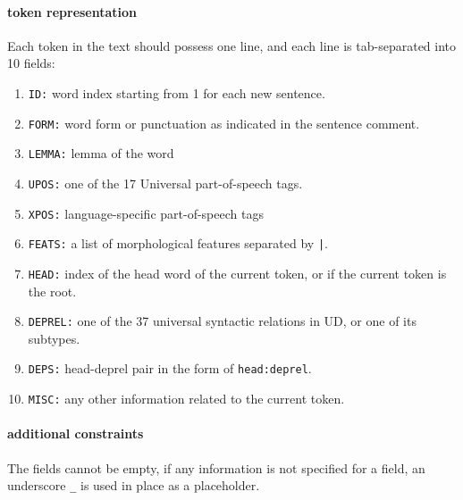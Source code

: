 \paragraph{token representation}
Each token in the text should possess one line, and each line is tab-separated into 10 fields:
\begin{enumerate}
	\item \texttt{ID:} word index starting from 1 for each new sentence.
	\item \texttt{FORM:} word form or punctuation as indicated in the sentence comment.
	\item \texttt{LEMMA:} lemma of the word
	\item \texttt{UPOS:} one of the 17 Universal part-of-speech tags.
	\item \texttt{XPOS:} language-specific part-of-speech tags
	\item \texttt{FEATS:} a list of morphological features separated by \texttt{|}.
	\item \texttt{HEAD:} index of the head word of the current token, or  if the current token is the root.
	\item \texttt{DEPREL:} one of the 37 universal syntactic relations in UD, or one of its subtypes.
	\item \texttt{DEPS:} head-deprel pair in the form of \texttt{head:deprel}.
	\item \texttt{MISC:} any other information related to the current token.
\end{enumerate}
\paragraph{additional constraints} The fields cannot be empty, if any information is not specified for a field, an underscore \texttt{\_} is used in place as a placeholder.

